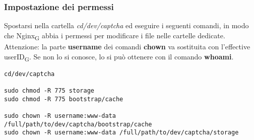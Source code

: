 \subsubsection{Impostazione dei permessi}
Spostarsi nella cartella \textit{cd/dev/captcha} ed eseguire i seguenti comandi, in modo che Nginx\textsubscript{G} abbia i permessi per modificare i file nelle cartelle dedicate. Attenzione: la parte \textbf{username} dei comandi \textbf{chown} va sostituita con l'effective userID\textsubscript{G}. Se non lo si conosce, lo si può ottenere con il comando \textbf{whoami}. 
\begin{verbatim}
cd/dev/captcha

sudo chmod -R 775 storage
sudo chmod -R 775 bootstrap/cache

sudo chown -R username:www-data /full/path/to/dev/captcha/bootstrap/cache 
sudo chown -R username:www-data /full/path/to/dev/captcha/storage
\end{verbatim}

